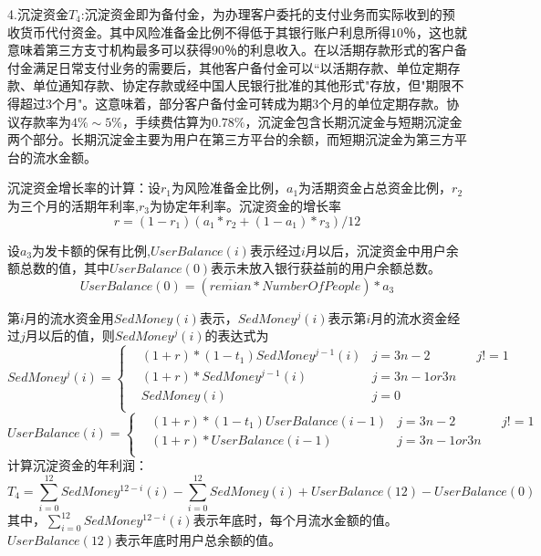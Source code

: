 \documentclass[withoutpreface,bwprint]{cumcmthesis} %
\begin{document}
4.沉淀资金$T_4$:沉淀资金即为备付金，为办理客户委托的支付业务而实际收到的预收货币代付资金。其中风险准备金比例不得低于其银行账户利息所得$10$％，这也就意味着第三方支寸机构最多可以获得$90$％的利息收入。在以活期存款形式的客户备付金满足日常支付业务的需要后，其他客户备付金可以“以活期存款、单位定期存款、单位通知存款、协定存款或经中国人民银行批准的其他形式"存放，但"期限不得超过3个月"。这意味着，部分客户备付金可转成为期3个月的单位定期存款。协议存款率为$4\%\sim5\%$，手续费估算为$0.78\%$，沉淀金包含长期沉淀金与短期沉淀金两个部分。长期沉淀金主要为用户在第三方平台的余额，而短期沉淀金为第三方平台的流水金额。

沉淀资金增长率的计算：设$r_1$为风险准备金比例，$a_1$为活期资金占总资金比例，$r_2$为三个月的活期年利率,$r_3$为协定年利率。沉淀资金的增长率
\begin{equation}
r=(1-r_1)(a_1*r_2+(1-a_1)*r_3)/12
\end{equation}

设$a_3$为发卡额的保有比例,$UserBalance(i)$表示经过$i$月以后，沉淀资金中用户余额总数的值，其中$UserBalance(0)$表示未放入银行获益前的用户余额总数。
\begin{equation}
UserBalance(0)=(\overline {remian} * {NumberOfPeople})*a_3
\end{equation}

第$i$月的流水资金用$SedMoney(i)$表示，$SedMoney^j(i)$表示第$i$月的流水资金经过$j$月以后的值，则$SedMoney^j(i)$的表达式为
\begin{equation}
SedMoney^j(i)=\left\{
\begin{aligned}
& (1+r)*(1-t_1)SedMoney^{j-1}(i) &j=3n-2&&j != 1\\
&(1+r)*SedMoney^{j-1}(i)  & j=3n-1or3n\\
&SedMoney(i)  & j=0\\
\end{aligned}
\right.
\end{equation}
\begin{equation}
UserBalance(i)=\left\{
\begin{aligned}
& (1+r)*(1-t_1)UserBalance(i-1) &j=3n-2&&j != 1\\
&(1+r)*UserBalance(i-1)  & j=3n-1or3n\\
\end{aligned}
\right.
\end{equation}
计算沉淀资金的年利润：
\begin{equation}
T_4=\sum_{i=0}^{12} SedMoney^{12-i}(i)-\sum_{i=0}^{12} SedMoney(i)+UserBalance(12)-UserBalance(0)
\end{equation}
其中，$\sum_{i=0}^{12} SedMoney^{12-i}(i)$表示年底时，每个月流水金额的值。$UserBalance(12)$表示年底时用户总余额的值。
\end{document}
